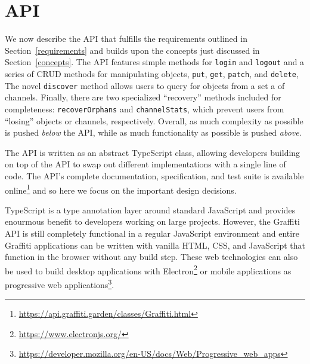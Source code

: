 \section{API}
\label{api}

We now describe the API that fulfills the requirements
outlined in Section~\ref{requirements} and builds upon the concepts
just discussed in Section~\ref{concepts}.
The API features simple methods for \texttt{login} and \texttt{logout}
and a series of CRUD methods for manipulating objects,
\texttt{put}, \texttt{get}, \texttt{patch}, and \texttt{delete},
The novel \texttt{discover} method allows users to query for objects
from a set a of channels.
Finally, there are two specialized ``recovery'' methods included for completeness:
\texttt{recoverOrphans} and \texttt{channelStats},
which prevent users from ``losing'' objects or channels, respectively.
Overall, as much complexity as possible is pushed \emph{below} the API,
while as much functionality as possible is pushed \emph{above}.

The API is written as an abstract TypeScript class, allowing
developers building on top of the API to swap out different implementations
with a single line of code.
The API's complete documentation, specification, and test suite is available online\footnote{
    \url{https://api.graffiti.garden/classes/Graffiti.html}
} and so here we focus on the important design decisions.

TypeScript is a type annotation layer around standard JavaScript
and provides enourmous benefit to developers working on large projects.
However, the Graffiti API is still completely functional
in a regular JavaScript environment and entire Graffiti applications can be written
with vanilla HTML, CSS, and JavaScript that function in the browser without
any build step.
These web technologies can also be used to build desktop applications
with Electron\footnote{
    \url{https://www.electronjs.org/}
} or mobile applications as progressive web applications\footnote{
    \url{https://developer.mozilla.org/en-US/docs/Web/Progressive_web_apps}
}.


